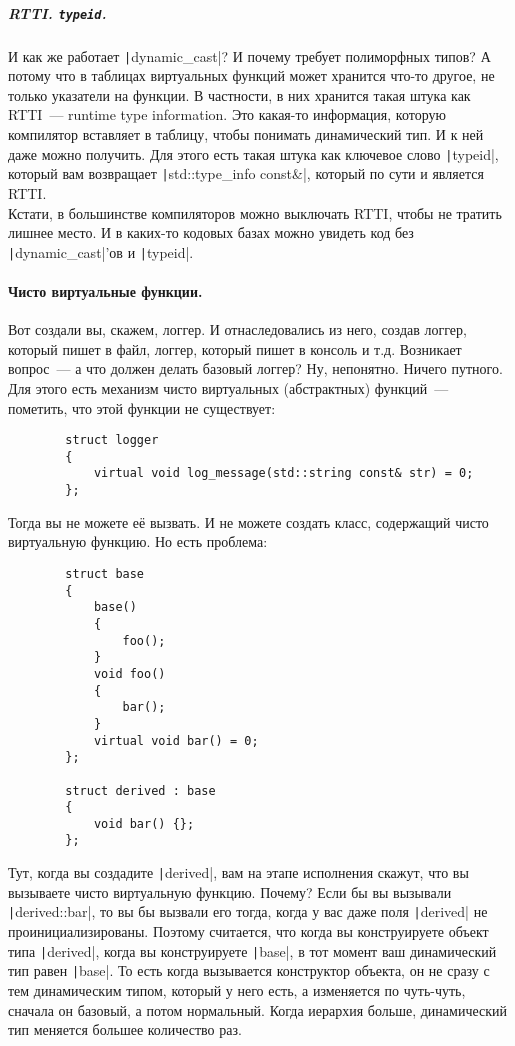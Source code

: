 \documentclass{article}
\begin{document}
    \subparagraph{RTTI. \texttt{typeid}.}
    И как же работает \texttt|dynamic_cast|? И почему требует полиморфных типов? А потому что в таблицах виртуальных функций может хранится что-то другое, не только указатели на функции. В частности, в них хранится такая штука как RTTI~--- runtime type information. Это какая-то информация, которую компилятор вставляет в таблицу, чтобы понимать динамический тип. И к ней даже можно получить. Для этого есть такая штука как ключевое слово \texttt|typeid|, который вам возвращает \texttt|std::type_info const&|, который по сути и является RTTI.\\
    Кстати, в большинстве компиляторов можно выключать RTTI, чтобы не тратить лишнее место. И в каких-то кодовых базах можно увидеть код без \texttt|dynamic_cast|'ов и \texttt|typeid|.
    \paragraph{Чисто виртуальные функции.}
    Вот создали вы, скажем, логгер. И отнаследовались из него, создав логгер, который пишет в файл, логгер, который пишет в консоль и т.д. Возникает вопрос~--- а что должен делать базовый логгер? Ну, непонятно. Ничего путного. Для этого есть механизм чисто виртуальных (абстрактных) функций~--- пометить, что этой функции не существует:
    \begin{verbatim}
        struct logger
        {
            virtual void log_message(std::string const& str) = 0;
        };
    \end{verbatim}
    Тогда вы не можете её вызвать. И не можете создать класс, содержащий чисто виртуальную функцию. Но есть проблема:
    \begin{verbatim}
        struct base
        {
            base()
            {
                foo();
            }
            void foo()
            {
                bar();
            }
            virtual void bar() = 0;
        };

        struct derived : base
        {
            void bar() {};
        };
    \end{verbatim}
    Тут, когда вы создадите \texttt|derived|, вам на этапе исполнения скажут, что вы вызываете чисто виртуальную функцию. Почему? Если бы вы вызывали \texttt|derived::bar|, то вы бы вызвали его тогда, когда у вас даже поля \texttt|derived| не проинициализированы. Поэтому считается, что когда вы конструируете объект типа \texttt|derived|, когда вы конструируете \texttt|base|, в тот момент ваш динамический тип равен \texttt|base|. То есть когда вызывается конструктор объекта, он не сразу с тем динамическим типом, который у него есть, а изменяется по чуть-чуть, сначала он базовый, а потом нормальный. Когда иерархия больше, динамический тип меняется большее количество раз.\\
\end{document}
